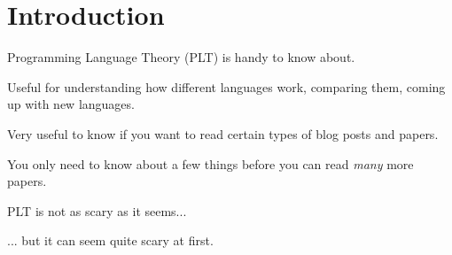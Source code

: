 
\section{Introduction}

\begin{frame}
  Programming Language Theory (PLT) is handy to know about.
\end{frame}

\begin{frame}
  Useful for understanding how different languages work, comparing them, coming
  up with new languages.
\end{frame}

\begin{frame}
  Very useful to know if you want to read certain types of blog posts and papers.
\end{frame}

\begin{frame}
  You only need to know about a few things before you can read {\it many} more papers.
\end{frame}

\begin{frame}
  PLT is not as scary as it seems...
\end{frame}

\begin{frame}
  ... but it can seem quite scary at first.
\end{frame}

